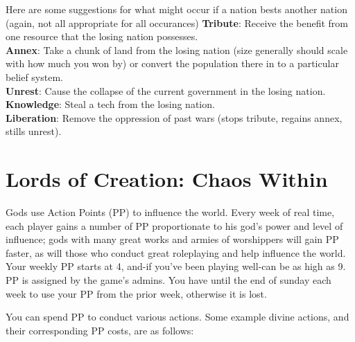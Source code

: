 \documentclass[10pt,a4paper]{article}
\begin{document}
Here are some suggestions for what might occur if a nation bests another nation (again, not all appropriate for all occurances)
\textbf{Tribute}: Receive the benefit from one resource that the losing nation possesses.\\
\textbf{Annex}: Take a chunk of land from the losing nation (size generally should scale with how much you won by) or convert the population there in to a particular belief system.\\
\textbf{Unrest}: Cause the collapse of the current government in the losing nation.\\
\textbf{Knowledge}: Steal a tech from the losing nation.\\
\textbf{Liberation}: Remove the oppression of past wars (stops tribute, regains annex, stills unrest).



\section*{Lords of Creation: Chaos Within}

Gods use Action Points (PP) to influence the world. Every week of real time, each player gains a number of PP proportionate to his god's power and level of influence; gods with many great works and armies of worshippers will gain PP faster, as will those who conduct great roleplaying and help influence the world. Your weekly PP starts at 4, and-if you've been playing well-can be as high as 9. PP is assigned by the game's admins.  You have until the end of sunday each week to use your PP from the prior week, otherwise it is lost.

You can spend PP to conduct various actions. Some example divine actions, and their corresponding PP costs, are as follows:
\end{document}
